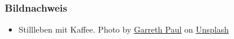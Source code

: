 \documentclass{beamer}
\begin{document}
\begin{frame}
\frametitle{Bildnachweis}
\begin{tiny}



 
\begin{itemize}

\item
Stillleben mit Kaffee. Photo by \href{https://unsplash.com/@garrethpb?utm_source=unsplash&utm_medium=referral&utm_content=creditCopyText}{Garreth Paul} on \href{https://unsplash.com/s/photos/still-life?utm_source=unsplash&utm_medium=referral&utm_content=creditCopyText}{Unsplash}
  
\end{itemize}
\end{tiny}
\end{frame}
\end{document}
